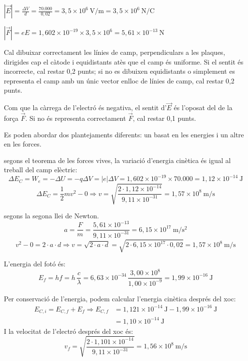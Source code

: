 \begin{solapartat}
 $|\vec{E}| = \frac{\Delta V}{d} = \frac{70.000}{0,02} = 3,5\times 10^{6}\ \mathrm{V/m} = 3,5\times 10^{6}\ \mathrm{N/C}$

 $|\vec{F}| = eE = 1,602\times 10^{-19}\times 3,5\times 10^{6} = 5,61\times 10^{-13}\ \mathrm{N}$

\medskip
{} Cal dibuixar correctament les línies de camp, perpendiculars a les plaques, dirigides cap el càtode i equidistants atès que el camp és uniforme. Si el sentit és incorrecte, cal restar 0,2 punts; si no es dibuixen equidistants o simplement es representa el camp amb un únic vector enlloc de línies de camp, cal restar 0,2 punts.

Com que la càrrega de l'electró és negativa, el sentit d'$\vec{E}$ és l'oposat del de la força $\vec{F}$. Si no és representa correctament $\vec{F}$, cal restar 0,1 punts.
\end{solapartat}

\begin{solapartat}
 Es poden abordar dos plantejaments diferents: un basat en les energies i un altre en les forces.

 segons el teorema de les forces vives, la variació d'energia cinètica és igual al treball del camp elèctric:
\[ \Delta E_C = W_e = -\Delta U = -q\Delta V = |e|\Delta V = 1,602\times 10^{-19}\times 70.000 = 1,12\times 10^{-14}\ \mathrm{J} \]
\[ \Delta E_C = \frac{1}{2} m v^2 - 0 \Longrightarrow v = \sqrt{\frac{2\cdot 1,12\times 10^{-14}}{9,11\times 10^{-31}}} = 1,57\times 10^{8}\ \mathrm{m/s} \]

 segons la segona llei de Newton.
\[ a = \frac{F}{m} = \frac{5,61\times 10^{-13}}{9,11\times 10^{-31}} = 6,15\times 10^{17}\ \mathrm{m/s^2} \]
\[ v^2 - 0 = 2\cdot a\cdot d \Rightarrow v = \sqrt{2\cdot a\cdot d} = \sqrt{2\cdot 6,15\times 10^{17}\cdot 0,02} = 1,57\times 10^{8}\ \mathrm{m/s} \]

 L'energia del fotó és:
\[ E_f = hf = h\,\frac{c}{\lambda} = 6,63\times 10^{-34}\,\frac{3,00\times 10^{8}}{1,00\times 10^{-9}} = 1,99\times 10^{-16}\ \mathrm{J} \]

 Per conservació de l'energia, podem calcular l'energia cinètica després del xoc:
\begin{align*}
E_{C,i} = E_{C,f} + E_f \Longrightarrow E_{C,f} &= 1,121\times 10^{-14}\ \mathrm{J} - 1,99\times 10^{-16}\ \mathrm{J}\\
&= 1,10\times 10^{-14}\ \mathrm{J}
\end{align*}
I la velocitat de l'electró després del xoc és:
\[ v_f = \sqrt{\frac{2\cdot 1,101\times 10^{-14}}{9,11\times 10^{-31}}} = 1,56\times 10^{8}\ \mathrm{m/s} \]
\end{solapartat}
